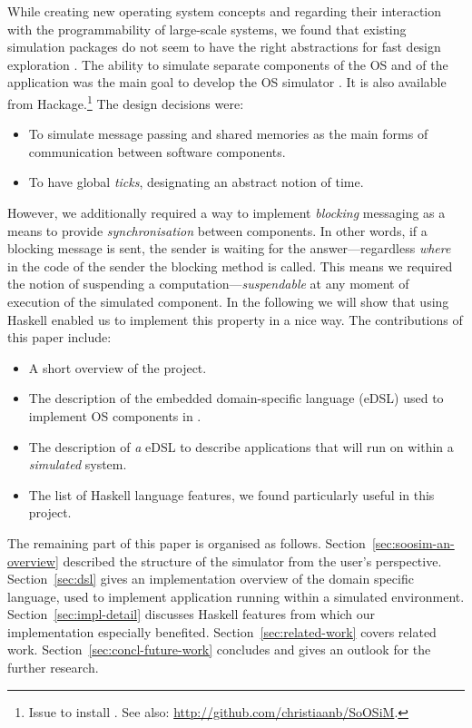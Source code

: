 While creating new operating system concepts and regarding their interaction with the programmability of large-scale systems, we found that existing simulation packages do not seem to have the right abstractions for fast design exploration \cite{cotson,omnet}.
The ability to simulate separate components of the OS and of the application was the main goal to develop the OS simulator \soosim \cite{Baaij:2012}.
It is also available from Hackage.\footnote{Issue  to install \soosim. See also:
\url{http://github.com/christiaanb/SoOSiM}.}
The design decisions were:
\begin{itemize}
\item To simulate message passing and shared memories as the main forms of communication between software components.
\item To have global \emph{ticks}, designating an abstract notion of time.
\end{itemize}
However, we additionally required a way to implement \emph{blocking} messaging as a means to provide \emph{synchronisation} between components.
In other words, if a blocking message is sent, the sender is waiting for the answer---regardless \emph{where} in the code of the sender the blocking  method is called.
This means we required the notion of suspending a computation---\emph{suspendable} at any moment of execution of the simulated component.
In the following we will show that using Haskell\nolinebreak[3] \cite{haskell-report} enabled us to implement this property in a nice way.
The contributions of this paper include:
\begin{itemize}
\item A short overview of the \soosim project.
\item The description of the embedded domain-specific language (eDSL) used to implement OS components in \soosim.
\item The description of \emph{a} eDSL to describe applications that will run on within a \soosim \emph{simulated} system.
\item The list of Haskell language features, we found particularly useful in this project.
\end{itemize}

The remaining part of this paper is organised as follows.
Section~\ref{sec:soosim-an-overview} described the structure of the \soosim simulator from the user's perspective.
Section~\ref{sec:dsl} gives an implementation overview of the domain specific language, used to implement application running within a \soosim simulated environment.
Section~\ref{sec:impl-detail} discusses Haskell features from which our implementation especially benefited.
Section~\ref{sec:related-work} covers related work.
Section~\ref{sec:concl-future-work} concludes and gives an outlook for the further research.

